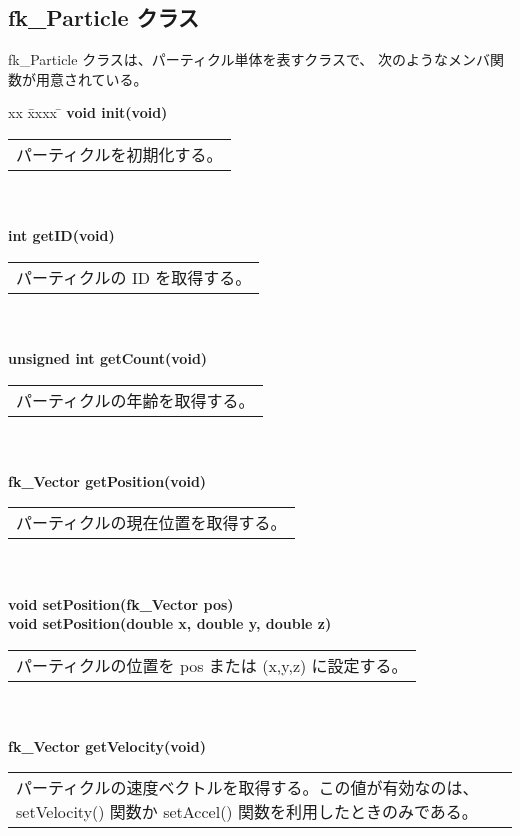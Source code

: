 \subsection{fk\_Particle クラス}
fk\_Particle クラスは、パーティクル単体を表すクラスで、
次のようなメンバ関数が用意されている。
\begin{tabbing}
xx \= xxxx \= \kill
\> \textbf{void init(void)} \\
	\> \> \begin{tabular}{p{15cm}}
		パーティクルを初期化する。
	\end{tabular} \\ \\

\> \textbf{int getID(void)} \\
	\> \> \begin{tabular}{p{15cm}}
		パーティクルの ID を取得する。
	\end{tabular} \\ \\

\> \textbf{unsigned int getCount(void)} \\
	\> \> \begin{tabular}{p{15cm}}
		パーティクルの年齢を取得する。
	\end{tabular} \\ \\

\> \textbf{fk\_Vector getPosition(void)} \\
	\> \> \begin{tabular}{p{15cm}}
		パーティクルの現在位置を取得する。
	\end{tabular} \\ \\

\> \textbf{void setPosition(fk\_Vector pos)} \\
\> \textbf{void setPosition(double x, double y, double z)} \\
	\> \> \begin{tabular}{p{15cm}}
		パーティクルの位置を pos または (x,y,z) に設定する。
	\end{tabular} \\ \\

\> \textbf{fk\_Vector getVelocity(void)} \\
	\> \> \begin{tabular}{p{15cm}}
		パーティクルの速度ベクトルを取得する。この値が有効なのは、
		setVelocity() 関数か setAccel() 関数を利用したときのみである。
	\end{tabular} \\ \\


\end{tabbing}
